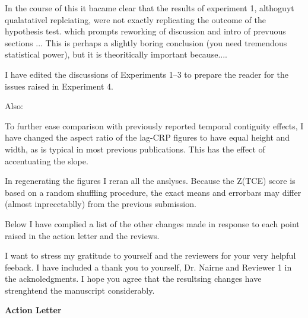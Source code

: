 \documentclass[12pt]{article}
\begin{document}
In the course of this it bacame clear that the results of experiment 1, althoguyt qualatativel replciating, were not exactly replicating the outcome of the hypothesis test.  which prompts reworking of discussion and intro of prevuous sections ... This is perhaps a slightly boring conclusion (you need tremendous statistical power), but it is theoritically important because....

I have edited the discussions of Experiments 1--3 to prepare the reader for the issues raised in Experiment 4.


Also:

To further ease comparison with previously reported temporal contiguity effects, I have changed the aspect ratio of the lag-CRP figures to have equal height and width, as is typical in most previous publications. This has the effect of accentuating the slope. 

In regenerating the figures I reran all the anslyses. Because the Z(TCE) score is based on a random shuffling procedure, the exact means and errorbars may differ (almost inprecetablly) from the previous submission. 


Below I have complied a list of the other changes made in response to each point raised in the action letter and the reviews. 

I want to stress my gratitude to yourself and the reviewers for your very helpful feeback. I have included a thank you to yourself, Dr. Nairne and Reviewer 1 in the acknoledgments. I hope you agree that the resultsing changes have strenghtend the manuscript considerably.

\vspace{20pt}

\textbf{\large{Action Letter}}
\end{document}
